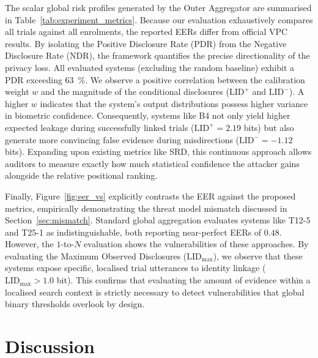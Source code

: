 The scalar global risk profiles generated by the Outer Aggregator are summarised in Table~\ref{tab:experiment_metrics}. Because our evaluation exhaustively compares all trials against all enrolments, the reported EERs differ from official VPC results. By isolating the Positive Disclosure Rate (PDR) from the Negative Disclosure Rate (NDR), the framework quantifies the precise directionality of the privacy loss. All evaluated systems (excluding the random baseline) exhibit a PDR exceeding \qty{63}{\percent}. We observe a positive correlation between the calibration weight $w$ and the magnitude of the conditional disclosures ($\mathrm{LID}^+$ and $\mathrm{LID}^-$). A higher $w$ indicates that the system's output distributions possess higher variance in biometric confidence. Consequently, systems like B4 not only yield higher expected leakage during successfully linked trials ($\mathrm{LID}^+ = 2.19$ bits) but also generate more convincing false evidence during misdirections ($\mathrm{LID}^- = -1.12$ bits). Expanding upon existing metrics like SRD, this continuous approach allows auditors to measure exactly how much statistical confidence the attacker gains alongside the relative positional ranking.

Finally, Figure~\ref{fig:eer_vs} explicitly contrasts the EER against the proposed metrics, empirically demonstrating the threat model mismatch discussed in Section~\ref{sec:mismatch}. Standard global aggregation evaluates systems like T12-5 and T25-1 as indistinguishable, both reporting near-perfect EERs of $0.48$. However, the $1$-to-$N$ evaluation shows the vulnerabilities of these approaches. By evaluating the Maximum Observed Disclosures ($\mathrm{LID}_{\text{max}}$), we observe that these systems expose specific, localised trial utterances to identity linkage ($\mathrm{LID}_{\text{max}} > 1.0$ bit). This confirms that evaluating the amount of evidence within a localised search context is strictly necessary to detect vulnerabilities that global binary thresholds overlook by design.

\section{Discussion}
\label{sec:discussion}

